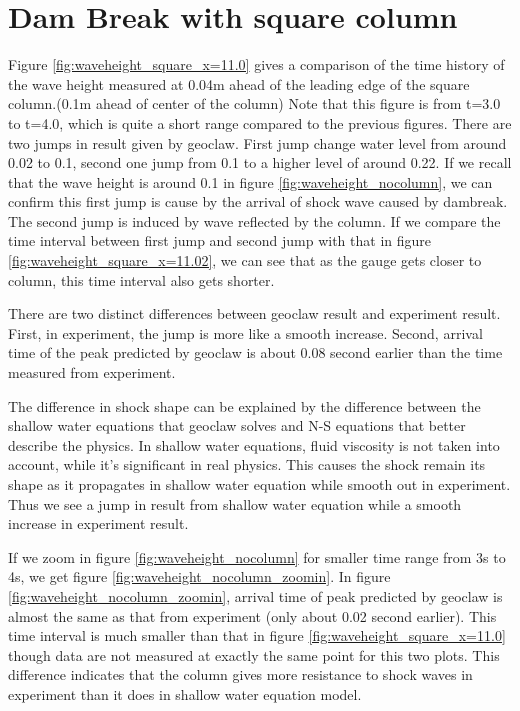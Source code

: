 \documentclass[11pt]{article}
\begin{document}
\section{Dam Break with square column}\label{Sec:Square}
Figure \ref{fig:waveheight_square_x=11.0} gives a comparison of the time history of the wave height measured at 0.04m ahead of the leading edge of the square column.(0.1m ahead of center of the column)
Note that this figure is from t=3.0 to t=4.0, which is quite a short range compared to the previous figures.
There are two jumps in result given by geoclaw. First jump change water level from around 0.02 to 0.1, second one jump from 0.1 to a higher level of around 0.22.
If we recall that the wave height is around 0.1 in figure \ref{fig:waveheight_nocolumn}, we can confirm this first jump is cause by the arrival of shock wave caused by dambreak. The second jump is induced by wave reflected by the column.  
If we compare the time interval between first jump and second jump with that in figure \ref{fig:waveheight_square_x=11.02}, we can see that as the gauge gets closer to column, this time interval also gets shorter.
\par
There are two distinct differences between geoclaw result and experiment result. First, in experiment, the jump is more like a smooth increase. Second, arrival time of the peak predicted by geoclaw is about 0.08 second earlier than the time measured from experiment.  
\par
The difference in shock shape can be explained by the difference between the shallow water equations that geoclaw solves and N-S equations that better describe the physics.
In shallow water equations, fluid viscosity is not taken into account, while it's significant in  real physics.
This causes the shock remain its shape as it propagates in shallow water equation while smooth out in experiment.
Thus we see a jump in result from shallow water equation while a smooth increase in experiment result.
\par
If we zoom in figure \ref{fig:waveheight_nocolumn} for smaller time range from 3s to 4s, we get figure \ref{fig:waveheight_nocolumn_zoomin}.
In figure \ref{fig:waveheight_nocolumn_zoomin}, arrival time of peak predicted by geoclaw is almost the same as that from experiment (only about 0.02 second earlier).  
This time interval is much smaller than that in figure \ref{fig:waveheight_square_x=11.0} though data are not measured at exactly the same point for this two plots. 
This difference indicates that the column gives more resistance to shock waves in experiment than it does in shallow water equation model. 
\end{document}
